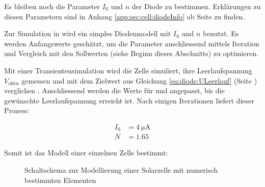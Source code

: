 \myfancybreak

Es   bleiben  noch   die  Parameter   $I_{\mathrm{S}}$  und   $n$  der   Diode
zu   bestimmen. Erkl\"arungen   zu   diesen    Parametern   sind   in   Anhang
\ref{app:sec:cell:diodeInfo}  ab   Seite  \pageref{app:sec:cell:diodeInfo}  zu
finden.

Zur   Simulation  in     wird   ein  simples   Diodenmodell  mit
$I_{\mathrm{S}}$   und   $n$  benutzt\footnotemark. Es   werden   Anfangswerte
gesch\"atzt, um  die Parameter  anschliessend mittels Iteration  und Vergleich
mit den Sollwerten (siehe Beginn dieses Abschnitts) zu optimieren.


Mit   einer    Transientensimulation   wird   die   Zelle    simuliert,   ihre
Leerlaufspannung  $V_{\mathrm{offen}}$  gemessen  und  mit  dem  Zielwert  aus
Gleichung   \ref{eq:diode:ULeerlauf}    (Seite   \pageref{eq:diode:ULeerlauf})
verglichen .  Anschliessend werden
die  Werte  f\"ur    und   angepasst,  bis  die  gew\"unschte
Leerlaufspannung  erreicht  ist.   Nach  einigen  Iterationen  liefert  dieser
Prozess\footnotemark:


\begin{align}
    \label{eq:cell:diode:IS:N:result}
    I_{\mathrm{S}} &= \SI{4}{\micro\ampere} \\
    N              &= 1.65
\end{align}

Somit ist  das Modell  einer einzelnen  Zelle bestimmt:

\begin{figure}[h!tb]
    \centering
    
    \caption{%
        Schaltschema   zur  Modellierung   einer   Solarzelle  mit   numerisch
        bestimmten Elementen
    }
    \label{fig:circuit:solarCell}
\end{figure}



